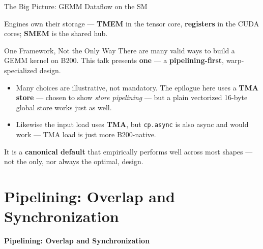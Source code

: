 \documentclass[aspectratio=169,professionalfonts]{beamer}
\newcommand{\code}[1]{\texttt{#1}}
\newcommand{\sectionslide}[2]{%
  \begin{frame}[plain]
    \begin{center}
      \vspace{1.8cm}
      \hypertarget{#1}{}%
      {\usebeamercolor[fg]{title}\Large\bfseries #2}
    \end{center}
  \end{frame}%
}
\begin{document}
\begin{frame}{The Big Picture: GEMM Dataflow on the SM}
\begin{center}
  \end{center}

  \vspace{0.1cm}
  {\footnotesize Engines own their storage --- \textbf{TMEM} in the tensor core,
  \textbf{registers} in the CUDA cores; \textbf{SMEM} is the shared hub.}
\end{frame}

\begin{frame}{One Framework, Not the Only Way}
  There are many valid ways to build a GEMM kernel on B200. This talk presents
  \textbf{one} --- a \textbf{pipelining-first}, warp-specialized design.

  \vspace{0.2cm}
  \begin{itemize}
    \item Many choices are illustrative, not mandatory. The epilogue here uses a
      \textbf{TMA store} --- chosen to show \emph{store pipelining} --- but a
      plain vectorized 16-byte global store works just as well.
    \item Likewise the input load uses \textbf{TMA}, but \code{cp.async} is also
      async and would work --- TMA load is just more B200-native.
  \end{itemize}

  \vspace{0.15cm}
  It is a \textbf{canonical default} that empirically performs well across most
  shapes --- not the only, nor always the optimal, design.
\end{frame}

\section{Pipelining: Overlap and Synchronization}
\sectionslide{toc:pipe}{Pipelining: Overlap and Synchronization}
\end{document}
